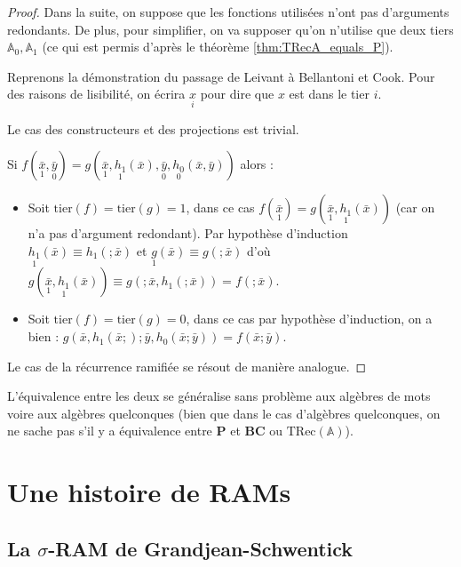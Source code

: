 \documentclass{report}
\newcommand{\bbA}{\mathbb{A}}
\newcommand{\TRec}[1]{\text{TRec}\left(\mathbb{#1}\right)}
\begin{document}
\begin{proof}
				Dans la suite, on suppose que les fonctions utilisées n'ont pas d'arguments redondants. De plus, pour simplifier, on va supposer qu'on n'utilise que deux tiers $\bbA_0, \bbA_1$ (ce qui est permis d'après le théorème \ref{thm:TRecA_equals_P}).
				
				Reprenons la démonstration du passage de Leivant à Bellantoni et Cook. Pour des raisons de lisibilité, on écrira $\underset{i}{x}$ pour dire que $x$ est dans le tier $i$.
				
				Le cas des constructeurs et des projections est trivial.
				
				Si $f(\underset{1}{\bar{x}}, \underset{0}{\bar{y}}) = g( \underset{1}{\bar{x}}, \underset{1}{h_1}(\bar{x}), \underset{0}{\bar{y}}, \underset{0}{h_0}(\bar{x}, \bar{y}))$ alors :
				
				\begin{itemize}[itemsep=-1mm]
					\item 	Soit $\text{tier}(f) = \text{tier}(g) = 1$, dans ce cas $f(\underset{1}{\bar{x}}) = g( \underset{1}{\bar{x}}, \underset{1}{h_1}(\bar{x}))$ (car on n'a pas d'argument redondant). Par hypothèse d'induction $\underset{1}{h_1}(\bar{x}) \equiv h_1(;\bar{x})$ et $\underset{1}{g}(\bar{x}) \equiv g(;\bar{x})$ d'où $g(\underset{1}{\bar{x}}, \underset{1}{h_1}(\bar{x})) \equiv g(; \bar{x}, h_1(;\bar{x})) = f(; \bar{x})$.
					
					\item 	Soit $\text{tier}(f) = \text{tier}(g) = 0$, dans ce cas par hypothèse d'induction, on a bien : $g( \bar{x}, h_1(\bar{x};) ; \bar{y}, h_0(\bar{x}; \bar{y})) = f(\bar{x} ; \bar{y})$.
				\end{itemize}
				
				Le cas de la récurrence ramifiée se résout de manière analogue.
			\end{proof}
			
	
			L'équivalence entre les deux se généralise sans problème aux algèbres de mots voire aux algèbres quelconques (bien que dans le cas d'algèbres quelconques, on ne sache pas s'il y a équivalence entre $\textbf{P}$ et $\textbf{BC}$ ou $\TRec{A}$).
			
		
	\espace
	
	\espace
			
			
	\section{Une histoire de RAMs}
	\label{sec:RAM_story}

	
		\subsection{La $\sigma$-RAM de Grandjean-Schwentick}
		\label{subsec:sigma_RAM}
		
\end{document}
